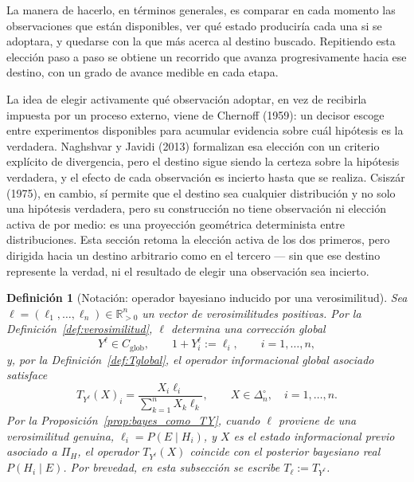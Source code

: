 ﻿\documentclass[12pt]{article}
\newtheorem{definicion}{Definición}[section]
\begin{document}
La manera de hacerlo, en términos generales, es comparar en cada momento las observaciones que están disponibles, ver qué estado produciría cada una si se adoptara, y quedarse con la que más acerca al destino buscado. Repitiendo esta elección paso a paso se obtiene un recorrido que avanza progresivamente hacia ese destino, con un grado de avance medible en cada etapa.

La idea de elegir activamente qué observación adoptar, en vez de recibirla impuesta por un proceso externo, viene de Chernoff (1959): un decisor escoge entre experimentos disponibles para acumular evidencia sobre cuál hipótesis es la verdadera. Naghshvar y Javidi (2013) formalizan esa elección con un criterio explícito de divergencia, pero el destino sigue siendo la certeza sobre la hipótesis verdadera, y el efecto de cada observación es incierto hasta que se realiza. Csiszár (1975), en cambio, sí permite que el destino sea cualquier distribución y no solo una hipótesis verdadera, pero su construcción no tiene observación ni elección activa de por medio: es una proyección geométrica determinista entre distribuciones. Esta sección retoma la elección activa de los dos primeros, pero dirigida hacia un destino arbitrario como en el tercero — sin que ese destino represente la verdad, ni el resultado de elegir una observación sea incierto.


\begin{definicion}[Notación: operador bayesiano inducido por una verosimilitud]\label{def:Tell_trayectorias}
Sea \(\ell=(\ell_1,\dots,\ell_n)\in\mathbb R_{>0}^n\) un vector de verosimilitudes positivas. Por la Definición~\ref{def:verosimilitud}, \(\ell\) determina una corrección global
\[
Y^\ell\in C_{\mathrm{glob}},
\qquad
1+Y_i^\ell:=\ell_i,
\qquad i=1,\dots,n,
\]
y, por la Definición~\ref{def:Tglobal}, el operador informacional global asociado satisface
\[
T_{Y^\ell}(X)_i
=
\frac{X_i\ell_i}{\sum_{k=1}^n X_k\ell_k},
\qquad X\in\Delta_n^\circ,\quad i=1,\dots,n.
\]
Por la Proposición~\ref{prop:bayes_como_TY}, cuando \(\ell\) proviene de una verosimilitud genuina, \(\ell_i=P(E\mid H_i)\), y \(X\) es el estado informacional previo asociado a \(\Pi_H\), el operador \(T_{Y^\ell}(X)\) coincide con el posterior bayesiano real \(P(H_i\mid E)\). Por brevedad, en esta subsección se escribe \(T_\ell:=T_{Y^\ell}\).
\end{definicion}
\end{document}
